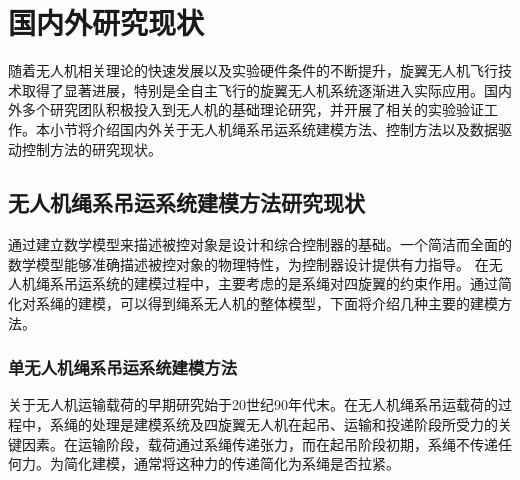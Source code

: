 \documentclass[lang=chs, degree=master, blindreview=true, winfonts=true]{yanputhesis}
\begin{document}





\section{国内外研究现状}
随着无人机相关理论的快速发展以及实验硬件条件的不断提升，旋翼无人机飞行技术取得了显著进展，特别是全自主飞行的旋翼无人机系统逐渐进入实际应用。国内外多个研究团队积极投入到无人机的基础理论研究，并开展了相关的实验验证工作。本小节将介绍国内外关于无人机绳系吊运系统建模方法、控制方法以及数据驱动控制方法的研究现状。
\subsection{无人机绳系吊运系统建模方法研究现状}
通过建立数学模型来描述被控对象是设计和综合控制器的基础。一个简洁而全面的数学模型能够准确描述被控对象的物理特性，为控制器设计提供有力指导。
在无人机绳系吊运系统的建模过程中，主要考虑的是系绳对四旋翼的约束作用。通过简化对系绳的建模，可以得到绳系无人机的整体模型，下面将介绍几种主要的建模方法。
\subsubsection{单无人机绳系吊运系统建模方法}
关于无人机运输载荷的早期研究始于20世纪90年代末\cite{oshman1999mini,borky1997payload}。在无人机绳系吊运载荷的过程中，系绳的处理是建模系统及四旋翼无人机在起吊、运输和投递阶段所受力的关键因素\cite{qian2020guidance}。在运输阶段，载荷通过系绳传递张力，而在起吊阶段初期，系绳不传递任何力\cite{guo2020controlling}。为简化建模，通常将这种力的传递简化为系绳是否拉紧\cite{tang2018aggressive}。
\end{document}
